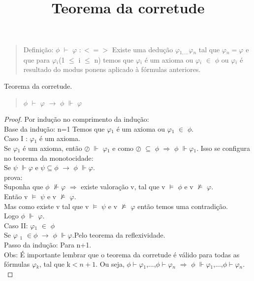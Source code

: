 \documentclass[12pt]{report}
\title{Teorema da corretude}
\begin{document}
\maketitle
\begin{quote}
\indent Definição: $\phi$ $\vdash$ $\varphi$ $:<=>$ Existe uma dedução $\varphi$$_{1,...}$$\varphi$$_{n}$ tal que $\varphi$$_{n}$$=$$\varphi$ e que para $\varphi$$_{i}$(1 $\leq$ i $\leq$ n) 
temos que $\varphi$$_{i}$ é um axioma ou $\varphi$$_{i}$ {$\in$} $\phi$ ou $\varphi$$_{i}$ é resultado do modus ponens aplicado à fórmulas anteriores. 
\end{quote}
\indent Teorema da corretude.
\begin{quote}
\indent $\phi$ $\vdash$ $\varphi$ $\rightarrow$ $\phi$ $\Vdash$ $\varphi$
\end{quote}
\begin{proof}
\indent Por indução no comprimento da indução:\\
\indent Base da indução: n=1 Temos que $\varphi$$_{1}$ é um axioma ou $\varphi$$_{1}$ $\in$ $\phi$.\\
\indent Caso I : $\varphi$$_{1}$ é um axioma.\\
\indent Se $\varphi$$_{1}$ é um axioma, então $\oslash$ $\Vdash$ $\varphi$$_{1}$ e como $\oslash$ $\subseteq$ $\phi$ $\Longrightarrow$ $\phi$ $\Vdash$$\varphi$$_{1}$. Isso se configura no teorema da monotocidade:\\
\indent Se $\psi$ $\Vdash$$\varphi$ e $\psi$$\subseteq$$\phi$ $\rightarrow$ $\phi$ $\Vdash$$\varphi$.\\
\indent	prova:\\
\indent	Suponha que $\phi$ $\nVdash$$\varphi$ $\Longrightarrow$ existe valoração v, tal que v $\vDash$ $\phi$ e v $\nvDash$ $\varphi$.\\
\indent	Então v $\vDash$ $\psi$ e v $\nvDash$ $\varphi$.\\
\indent	Mas como existe v tal que v $\vDash$ $\psi$ e v $\nvDash$ $\varphi$ então temos uma contradição.\\
\indent	Logo $\phi$ $\Vdash$ $\varphi$.\\
\indent Caso II: $\varphi$$_{1}$ $\in$ $\phi$\\ 
\indent Se $\varphi$ $_{1}$ $\in$$\phi$ $\rightarrow$ $\phi$ $\Vdash$$\varphi$.Pelo teorema da reflexividade.\\
\indent Passo da indução: Para n+1.\\
\indent Obs: É importante lembrar que o teorema da corretude é válido para todas as fórmulas $\varphi$$_{k}$, tal que k$<n+1$. Ou seja, $\phi$$\vdash$$\varphi$$_{1}$,...,$\phi$$\vdash$$\varphi$$_{n}$ $\Longrightarrow$ $\phi$ $\Vdash$$\varphi$$_{1}$,...,$\phi$$\vdash$$\varphi$$_{n}$.\\
$$
\end{proof}
\end{document}
